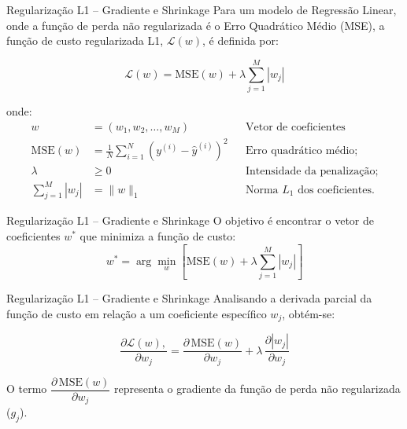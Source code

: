 \documentclass{beamer}
\begin{document}
\begin{frame}{Regularização L1 – Gradiente e Shrinkage}
Para um modelo de Regressão Linear, onde a função de perda não regularizada é o Erro Quadrático Médio (MSE), a função de custo regularizada L1, $\mathcal{L}(w)$, é definida por:

\begin{equation}
    \mathcal{L}(w) = \text{MSE}(w) + \lambda \sum_{j=1}^{M} |w_j|
\end{equation}

    \noindent onde:
    \begin{align*}
        w &= (w_1, w_2, \dots, w_M) && \text{Vetor de coeficientes} \\
        \text{MSE}(w) &= \frac{1}{N} \sum_{i=1}^{N} (y^{(i)} - \hat{y}^{(i)})^2 && \text{Erro quadrático médio;} \\
        \lambda &\ge 0 && \text{Intensidade da penalização;} \\
        \sum_{j=1}^{M} |w_j| &= \|w\|_1 && \text{Norma $L_1$ dos coeficientes.}
    \end{align*}
\end{frame}

\begin{frame}{Regularização L1 – Gradiente e Shrinkage}
O objetivo é encontrar o vetor de coeficientes $w^*$ que minimiza a função de custo:
    \begin{equation}
    w^* = \arg\min_{w} \left[ \text{MSE}(w) + \lambda \sum_{j=1}^{M} |w_j| \right]
    \end{equation}
\end{frame}


\begin{frame}{Regularização L1 – Gradiente e Shrinkage}
Analisando a derivada parcial da função de custo em relação a um coeficiente específico $w_j$, obtém-se:

\begin{equation}
\frac{\partial \mathcal{L}(w),}{\partial w_j} = \frac{\partial \, \text{MSE}(w)}{\partial w_j} + \lambda \, \frac{\partial |w_j|}{\partial w_j}
\end{equation}

O termo $\dfrac{\partial \, \text{MSE}(w)}{\partial w_j}$ representa o gradiente da função de perda não regularizada ($g_j$).
\end{frame}
\end{document}
